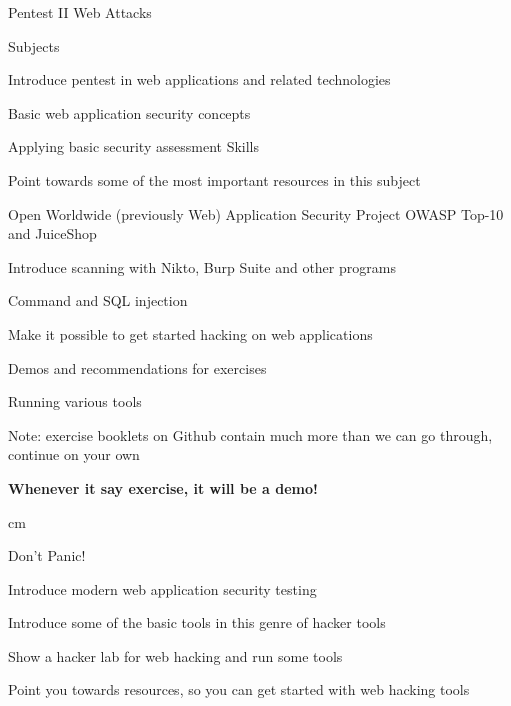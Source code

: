 \documentclass[Screen16to9,17pt]{foils}
\begin{document}


\mytitlepage
{Pentest II Web Attacks}


\LogoOn


\begin{list1}
\item Subjects
\begin{list2}
\item Introduce pentest in web applications and related technologies
\item Basic web application security concepts
\item Applying basic security assessment Skills
\item Point towards some of the most important resources in this subject
\item Open Worldwide (previously Web) Application Security Project OWASP Top-10 and JuiceShop
\item Introduce scanning with Nikto, Burp Suite and other programs
\item Command and SQL injection
\item Make it possible to get started hacking on web applications
\end{list2}
\item Demos and recommendations for exercises
\begin{list2}
\item Running various tools
\item Note: exercise booklets on Github contain much more than we can go through, continue on your own
\end{list2}
\end{list1}

{\bf Whenever it say exercise, it will be a demo!}

 cm

\centerline{\color{titlecolor}\LARGE Don't Panic!}


\begin{list1}
\item Introduce modern web application security testing
\item Introduce some of the basic tools in this genre of hacker tools
\item Show a hacker lab for web hacking and run some tools
\item Point you towards resources, so you can get started with web hacking  tools
\end{list1}
\end{document}
